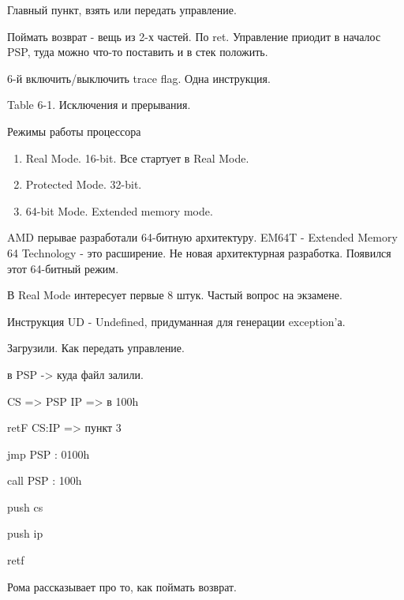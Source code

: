 Главный пункт, взять или передать управление. 




Поймать возврат - вещь из 2-х частей. По ret. Управление приодит в началос PSP, туда можно что-то поставить и в стек положить.

6-й включить/выключить trace flag. Одна инструкция.

Table 6-1. Исключения и прерывания.

Режимы работы процессора
\begin{enumerate}
\item Real Mode. 16-bit. Все стартует в Real Mode. 
\item Protected Mode. 32-bit.
\item 64-bit Mode. Extended memory mode.
\end{enumerate}

AMD перывае разработали 64-битную архитектуру. EM64T - Extended Memory 64 Technology - это расширение. Не новая архитектурная разработка. Появился этот 64-битный режим. 
\begin{rem}В Real Mode интересует первые 8 штук. Частый вопрос на экзамене.\end{rem}
Инструкция UD - Undefined, придуманная для генерации exception'а.

Загрузили. Как передать управление.

в PSP -> куда файл залили. 

CS => PSP
IP => в 100h

retF CS:IP => пункт 3

jmp PSP : 0100h

call PSP : 100h

push cs

push ip

retf


Рома рассказывает про то, как поймать возврат. 